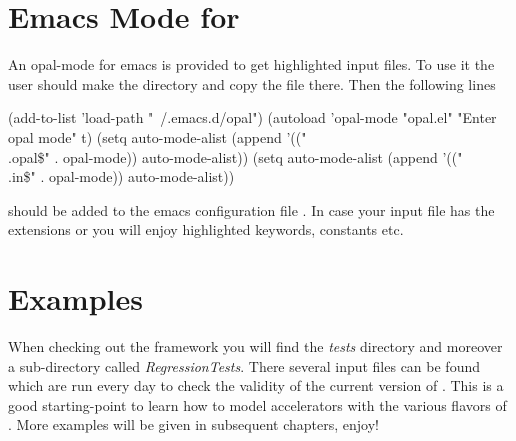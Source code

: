 \section{Emacs Mode for \opal}
An opal-mode for emacs is provided to get highlighted input files. To use it the user should make the directory  and copy the file  there. Then the following lines
\begin{footnotesize}
\begin{example}
(add-to-list 'load-path "~/.emacs.d/opal")
(autoload 'opal-mode "opal.el" "Enter opal mode" t)
(setq auto-mode-alist (append '(("\\.opal\$" . opal-mode)) auto-mode-alist))
(setq auto-mode-alist (append '(("\\.in\$" . opal-mode)) auto-mode-alist))
\end{example}
\end{footnotesize}
should be added to the emacs configuration file . In case your input file has the extensions  or   you will enjoy highlighted
keywords, constants etc.

\section{Examples}
When checking out the \opal framework you will find the \emph{tests} directory and moreover
a sub-directory called \emph{RegressionTests}. There several input files can be found which are
run every day to check the validity of the current version of \opal. This is a good starting-point to learn how to
model accelerators with the various flavors of \opal. More examples will be given in subsequent chapters, enjoy!


